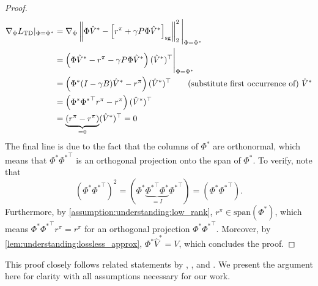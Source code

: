\begin{proof}
    \begin{align}
        \nabla_\Phi L_\text{TD}|_{\Phi = \Phi^*} & =  \nabla_{\Phi} \left\lVert \Phi \hat{V}^* - \left[r^\pi + \gamma P\Phi \hat{V}^*\right]_\text{sg} \right\rVert_2^2\Bigg|_{\Phi = \Phi^*}\\
        & = \left(\Phi \hat{V}^* - r^\pi - \gamma P\Phi {\hat{V}}^*\right) (\hat{V}^*)^\top\Bigg|_{\Phi = \Phi^*} \\
        & = \left(\Phi^* (I - \gamma B) {\hat{V}}^* - r^\pi \right)(\hat{V}^*)^\top \quad\quad \text{(substitute first occurrence of)~$\hat{V}^*$}\\
        & = \left(\Phi^* {\Phi^*}^\top r^\pi - r^\pi \right)({\hat{V}}^*)^\top\\
        & = \underbrace{\left(r^\pi - r^\pi \right)}_{=0}({\hat{V}}^*)^\top = 0
    \end{align}
    The final line is due to the fact that the columns of $\Phi^*$ are orthonormal, which means that $\Phi^*{\Phi^*}^\top$ is an orthogonal projection onto the span of $\Phi^*$. To verify, note that $$\left(\Phi^*{\Phi^*}^\top\right)^2 = \left(\Phi^* \underbrace{{\Phi^*}^\top \Phi^*}_{=I}{\Phi^*}^\top\right) = \left(\Phi^*{\Phi^*}^\top\right).$$ Furthermore, by \autoref{assumption:understanding:low_rank}, $r^\pi \in \text{span}(\Phi^*)$, which means $\Phi^*{\Phi^*}^\top r^\pi = r^\pi$ for an orthogonal projection $\Phi^*{\Phi^*}^\top$.
    Moreover, by \autoref{lem:understanding:lossless_approx}, $\Phi^* \hat{V}^* = V$, which concludes the proof.
\end{proof}

This proof closely follows related statements by \textcite{ghosh2020representations}, \textcite{tang2022understanding}, and \textcite{lelan2022generalization}. 
We present the argument here for clarity with all assumptions necessary for our work.


